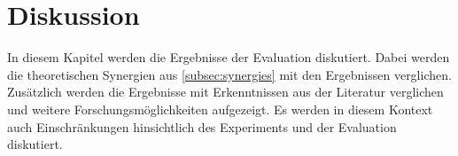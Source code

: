 \section{Diskussion}
In diesem Kapitel werden die Ergebnisse der Evaluation diskutiert.
Dabei werden die theoretischen Synergien aus \autoref{subsec:synergies} mit den Ergebnissen verglichen.
Zusätzlich werden die Ergebnisse mit Erkenntnissen aus der Literatur verglichen und weitere Forschungsmöglichkeiten aufgezeigt.
Es werden in diesem Kontext auch Einschränkungen hinsichtlich des Experiments und der Evaluation diskutiert.\\







